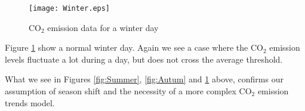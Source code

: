 \documentclass[Main]{subfiles}
\begin{document}
		\begin{figure}[H]
			\centering
			\texttt{[image: Winter.eps]}
			\caption{CO$_2$ emission data for a winter day}
			\label{fig:Winter}
		\end{figure}
	

		Figure \ref{fig:Winter} show a normal winter day.
		Again we see a case where the CO$_2$ emission levels fluctuate a lot during a day, but does not cross the average threshold.

		What we see in Figures \ref{fig:Summer}, \ref{fig:Autum} and \ref{fig:Winter} above, confirms our assumption of season shift and the necessity of a more complex CO$_2$ emission trends model.
		
\end{document}
